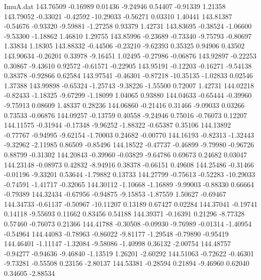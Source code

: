 \begin{filecontents}{ImuA.dat}
 143.76509   -0.16989    0.01436   -9.24946    0.54407   -0.91339    1.21358
 143.79052   -0.33021   -0.42592  -10.29033   -0.56271    0.03310    1.40441
 143.81387   -0.54676   -0.93320   -9.59881   -1.27258    0.93379    1.42731
 143.83695   -0.38524   -1.06600   -9.53300   -1.18862    1.46810    1.29755
 143.85996   -0.23689   -0.73340   -9.75793   -0.80697    1.33834    1.18305
 143.88332   -0.44506   -0.23210   -9.62393    0.35325    0.94906    0.43502
 143.90634   -0.26201    0.33978   -9.16451    1.02495   -0.27986   -0.06876
 143.92897   -0.22253    0.30867   -9.43610    0.92572   -0.61571   -0.22905
 143.95191   -0.12203   -0.16271   -9.54138    0.38378   -0.92866    0.62584
 143.97541   -0.46301   -0.87218  -10.35135   -1.02833    0.02546    1.37388
 143.99898   -0.65324   -1.25743   -9.38226   -1.55500    0.72007    1.42731
 144.02218   -0.82433   -1.18325   -9.67299   -1.18099    1.04065    0.93880
 144.04633   -0.65444   -0.39960   -9.75913    0.08609    1.48337    0.28236
 144.06860   -0.21416    0.31466   -9.09033    0.03266    0.73533   -0.06876
 144.09257   -0.13759    0.40558   -9.24946    0.75016   -0.76073    0.12207
 144.11575   -0.31944   -0.17348   -9.96252   -1.88322   -0.65387    0.35106
 144.13892   -0.77767   -0.94995   -9.62154   -1.70003    0.24682   -0.00770
 144.16193   -0.82313   -1.32443   -9.32962   -2.11985    0.86509   -0.85496
 144.18522   -0.47737   -0.46899   -9.79980   -0.96726    0.88799   -0.31302
 144.20843   -0.39960   -0.03829   -9.64786    0.69673    0.24682    0.03047
 144.23148   -0.08973    0.42832   -8.94916    0.38378   -0.66151    0.49608
 144.25486   -0.31466   -0.01196   -9.33201    0.53644   -1.79882    0.13733
 144.27799   -0.75613   -0.52283  -10.29033   -0.74591   -1.41717   -0.32065
 144.30112   -1.10668   -1.16889   -9.99003   -0.88330    0.66664   -0.79389
 144.32434   -0.67956   -0.94875   -9.15853   -1.87559    1.50627   -0.69467
 144.34733   -0.61137   -0.50967  -10.11207    0.13189    0.67427    0.02284
 144.37041   -0.19741    0.14118   -9.55693    0.11662    0.83456    0.54188
 144.39371   -0.16391    0.21296   -8.77328    0.57460   -0.76073    0.21366
 144.41788   -0.30508   -0.09930   -9.76989   -0.01314   -1.40954   -0.54964
 144.44083   -0.78963   -0.86022   -9.81177   -1.29548   -0.79890   -0.95419
 144.46401   -1.11147   -1.32084   -9.58086   -1.40998    0.36132   -2.00754
 144.48757   -0.94277   -0.94636   -9.46840   -1.13519    1.26201   -2.60292
 144.51063   -0.72622   -0.46301   -9.73281   -0.55508    0.23156   -2.80137
 144.53381   -0.28594    0.21894   -9.46960    0.62040    0.34605   -2.88534

\end{filecontents}
